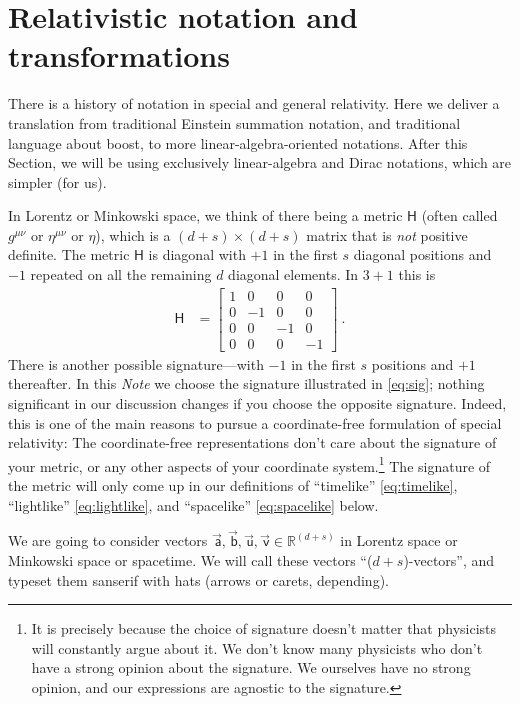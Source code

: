 \documentclass{article}
\newcommand{\metric}{\mathsf{H}}
\newcommand\upvec[1]{\!\vec{\,\mathrm{#1}}}
\newcommand{\Lvec}[1]{\upvec{\mathsf{#1}}} %
\newcommand{\plus}{\!+\!} %
\newcommand{\documentname}{\textsl{Note}}
\begin{document}
\section{Relativistic notation and transformations}\label{sec:notation}

There is a history of notation in special and general relativity.
Here we deliver a translation from traditional Einstein summation notation, and traditional language about boost, to more linear-algebra-oriented notations.
After this Section, we will be using exclusively linear-algebra and Dirac notations, which are simpler (for us).

In Lorentz or Minkowski space, we think of there being a metric $\metric$ (often called $g^{\mu\nu}$ or $\eta^{\mu\nu}$ or $\eta$), which is a $(d+s)\times(d+s)$ matrix that is \emph{not} positive definite.
The metric $\metric$ is diagonal with $+1$ in the first $s$ diagonal positions and $-1$ repeated on all the remaining $d$ diagonal elements.
In $3\plus1$ this is
\begin{align}\label{eq:sig}
    \metric &= \begin{bmatrix}1 & 0 & 0 & 0\\
                              0 & -1 & 0 & 0\\
                              0 & 0 & -1 & 0\\
                              0 & 0 & 0 & -1\end{bmatrix} ~.
\end{align}
There is another possible signature---with $-1$ in the first $s$ positions and $+1$ thereafter.
In this \documentname{} we choose the signature illustrated in \eqref{eq:sig}; nothing significant in our discussion changes if you choose the opposite signature.
Indeed, this is one of the main reasons to pursue a coordinate-free formulation of special relativity:
The coordinate-free representations don't care about the signature of your metric, or any other aspects of your coordinate system.\footnote{It is precisely because the choice of signature doesn't matter that physicists will constantly argue about it. We don't know many physicists who don't have a strong opinion about the signature. We ourselves have no strong opinion, and our expressions are agnostic to the signature.}
The signature of the metric will only come up in our definitions of ``timelike'' \eqref{eq:timelike}, ``lightlike'' \eqref{eq:lightlike}, and ``spacelike'' \eqref{eq:spacelike} below.

We are going to consider vectors $\Lvec{a}, \Lvec{b}, \Lvec{u}, \Lvec{v}\in\mathbb{R}^{(d+s)}$ in Lorentz space or Minkowski space or spacetime.
We will call these vectors ``($d\plus s$)-vectors'', and typeset them sanserif with hats (arrows or carets, depending).
\end{document}
